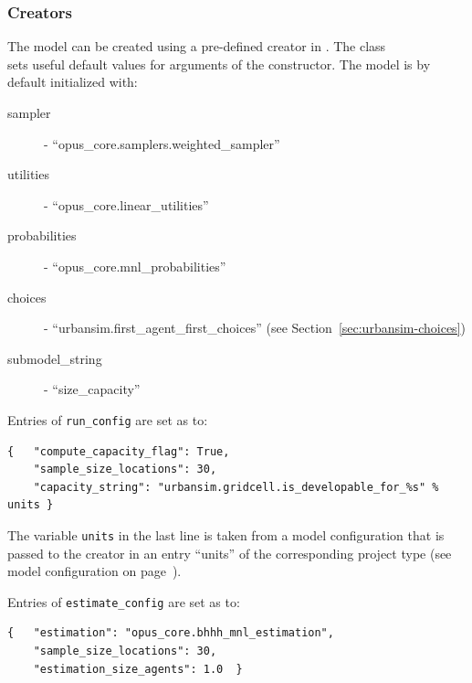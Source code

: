 \subsubsection{Creators}
%
The model \modelsindex can be created using a pre-defined creator in .
The class\\
 \modelsindex sets useful default
values for arguments of the constructor. The model \modelsindex is by default initialized with:
\begin{description}
\item[sampler] - ``opus_core.samplers.weighted_sampler''
\item[utilities] - ``opus_core.linear_utilities''
\item[probabilities] - ``opus_core.mnl_probabilities''
\item[choices] - ``urbansim.first_agent_first_choices'' (see
  Section~\ref{sec:urbansim-choices})
\item[submodel_string] - ``size_capacity''
\end{description}
Entries of \verb|run_config| are set as to:
\begin{verbatim}
{   "compute_capacity_flag": True,
    "sample_size_locations": 30,
    "capacity_string": "urbansim.gridcell.is_developable_for_%s" % units }
\end{verbatim}
The variable \variablesindex \verb|units| in the last line is taken from a model \modelsindex configuration
that is passed to the creator in an entry ``units'' of the corresponding
project type (see model \modelsindex configuration on
page~\pageref{page:model-configuration}).

Entries of \verb|estimate_config| are set as to:
\begin{verbatim}
{   "estimation": "opus_core.bhhh_mnl_estimation",
    "sample_size_locations": 30,
    "estimation_size_agents": 1.0  }
\end{verbatim}


